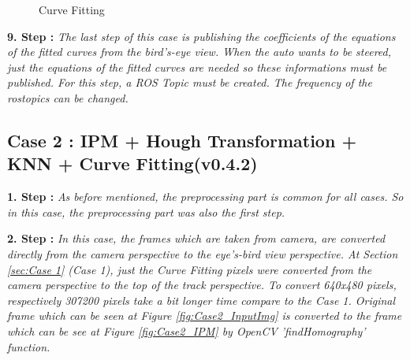 \begin{figure}[H]
  \centering
  \caption{Curve Fitting}
\end{figure} 


\textbf{9. Step : }\emph{\color{blue}The last step of this case is publishing the coefficients of the equations of the fitted curves from the bird's-eye view. When the auto wants to be steered, just the equations of the fitted curves are needed so these informations must be published. For this step, a ROS Topic must be created. The frequency of the rostopics can be changed.}

%

\subsection{Case 2 : IPM + Hough Transformation + KNN + Curve Fitting(v0.4.2)}\label{sec:Case 2}

\textbf{1. Step : }\emph{\color{blue}As before mentioned, the preprocessing part is common for all cases. So in this case, the preprocessing part was also the first step.}

\textbf{2. Step : }\emph{\color{blue}In this case, the frames which are taken from camera, are converted directly from the camera perspective to the eye's-bird view perspective. At Section \ref{sec:Case 1} (Case 1), just the Curve Fitting pixels were converted from the camera perspective to the top of the track perspective. To convert 640x480 pixels, respectively 307200 pixels take a bit longer time compare to the Case 1. Original frame which can be seen at Figure \ref{fig:Case2_InputImg} is converted to the frame which can be see at Figure \ref{fig:Case2_IPM} by OpenCV 'findHomography' function.}

